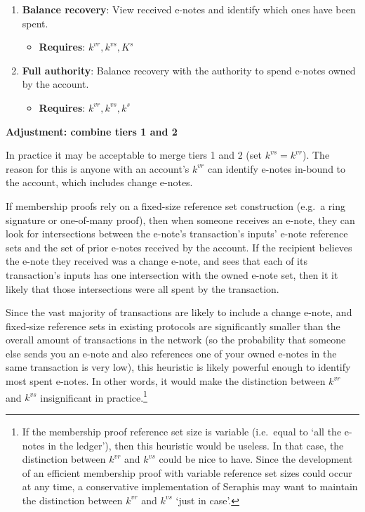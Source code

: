 \begin{itemize}
\begin{enumerate}
        \item \textbf{Balance recovery}: View received e-notes and identify which ones have been spent.
        \begin{itemize}
            \item \textbf{Requires}: $k^{vr}, k^{vs}, K^s$
        \end{itemize}

        \item \textbf{Full authority}: Balance recovery with the authority to spend e-notes owned by the account.
        \begin{itemize}
            \item \textbf{Requires}: $k^{vr}, k^{vs}, k^s$
        \end{itemize}
    \end{enumerate}
\end{itemize}

\textbf{Adjustment: combine tiers 1 and 2}

In practice it may be acceptable to merge tiers 1 and 2 (set $k^{vs} = k^{vr}$). The reason for this is anyone with an account's $k^{vr}$ can identify e-notes in-bound to the account, which includes change e-notes.

If membership proofs rely on a fixed-size reference set construction (e.g.\ a ring signature or one-of-many proof), then when someone receives an e-note, they can look for intersections between the e-note's transaction's inputs' e-note reference sets and the set of prior e-notes received by the account. If the recipient believes the e-note they received was a change e-note, and sees that each of its transaction's inputs has one intersection with the owned e-note set, then it it likely that those intersections were all spent by the transaction.

Since the vast majority of transactions are likely to include a change e-note, and fixed-size reference sets in existing protocols are significantly smaller than the overall amount of transactions in the network (so the probability that someone else sends you an e-note and also references one of your owned e-notes in the same transaction is very low), this heuristic is likely powerful enough to identify most spent e-notes. In other words, it would make the distinction between $k^{vr}$ and $k^{vs}$ insignificant in practice.\footnote{If the membership proof reference set size is variable (i.e.\ equal to `all the e-notes in the ledger'), then this heuristic would be useless. In that case, the distinction between $k^{vr}$ and $k^{vs}$ could be nice to have. Since the development of an efficient membership proof with variable reference set sizes could occur at any time, a conservative implementation of Seraphis may want to maintain the distinction between $k^{vr}$ and $k^{vs}$ `just in case'.}

